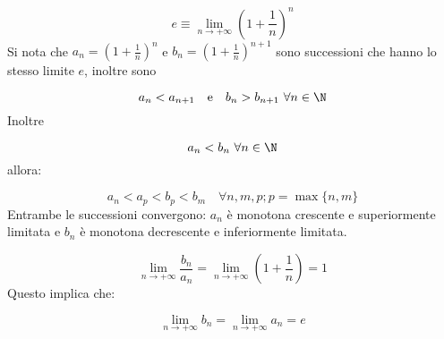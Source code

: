 \documentclass[../appunti.tex]{subfiles}
\begin{document}
\begin{eser}

\begin{equation}
	e \equiv \lim \limits_{n \to + \infty} \left( 1 + \frac{1}{n} \right)^n
\end{equation}
Si nota che $a_n = \left( 1 + \frac{1}{n} \right)^n$ e $ b_n =
\left( 1 + \frac{1}{n} \right)^{n+1}$ sono successioni  che hanno lo stesso limite $ e $, inoltre sono  

\begin{equation}
	a_n < a_{n + 1} \quad \mbox{e} \quad b_n > b_{n+1} \ \forall n \in \N
\end{equation}
Inoltre 

\begin{equation}
	a_n < b_n\ \forall n \in \N 
\end{equation}
allora: 

\begin{equation}
	a_n < a_p < b_p < b_m \quad \forall n,m,p; p = \max \{n, m\}
\end{equation}
Entrambe le successioni convergono: $a_n$ è monotona crescente e superiormente limitata e $b_n$ è monotona decrescente e inferiormente limitata.

\begin{equation}
	\lim \limits_{n \to + \infty} \frac{b_n}{a_n} = 
	\lim \limits_{n \to + \infty} \left( 1 + \frac{1}{n} \right) = 1
\end{equation}
Questo implica che:

\begin{equation} 
	\lim \limits_{n \to + \infty} b_n = 
	\lim \limits_{n \to + \infty} a_n = e
\end{equation}

\end{eser}


\end{document}
